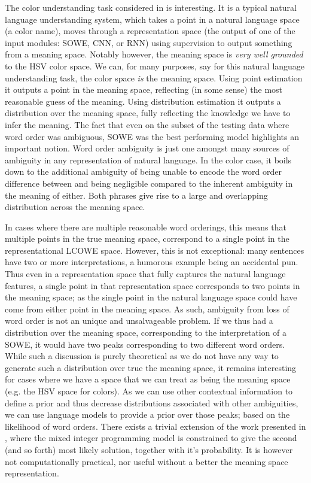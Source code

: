 \documentclass{book}
\begin{document}
The color understanding task considered in  is interesting.
It is a typical natural language understanding system,
which takes a point in a natural language space (a color name),
moves through a representation space (the output of one of the input modules: SOWE, CNN, or RNN) using supervision to output something from a meaning space.
Notably however, the meaning space is \emph{very well grounded} to the HSV color space.
We can, for many purposes, say for this natural language understanding task, the color space \emph{is} the meaning space.
Using point estimation it outputs a point in the meaning space, reflecting (in some sense) the most reasonable guess of the meaning.
Using distribution estimation it outputs a distribution over the meaning space, fully reflecting the knowledge we have to infer the meaning.
The fact that even on the subset of the testing data where word order was ambiguous, SOWE was the best performing model highlights an important notion.
Word order ambiguity is just one amongst many sources of ambiguity in any representation of natural language.
In the color case, it boils down to the additional ambiguity of being unable to encode the word order difference between  and  being negligible compared to the inherent ambiguity in the meaning of either.
Both phrases give rise to a large and overlapping distribution across the meaning space.

In cases where there are multiple reasonable word orderings,
this means that multiple points in the true meaning space, correspond to a single point in the representational LCOWE space.
However, this is not exceptional: 
many sentences have two or more interpretations, a humorous example being an accidental pun.
Thus even in a representation space that fully captures the natural language features,  a single point in that representation space
corresponds to two points in the meaning space;
as the single point in the natural language space could have come from either point in the meaning space.
As such, ambiguity from loss of word order is not an unique and unsalvageable problem.
If we thus had a distribution over the meaning space, corresponding to the interpretation of a SOWE, it would have two peaks corresponding to two different word orders.
While such a discussion is purely theoretical as we do not have any way to generate such a distribution over true the meaning space,
it remains interesting for cases where we have a space that we can treat as being the meaning space (e.g. the HSV space for colors).
As we can use other contextual information to define a prior and thus decrease distributions associated with other ambiguities,
we can use language models to provide a prior over those peaks; based on the likelihood of word orders.
There exists a trivial extension of the work presented in , where the mixed integer programming model is constrained to give the second (and so forth) most likely solution, together with it's probability.
It is however not computationally practical, nor useful without a better the meaning space representation.
\end{document}
